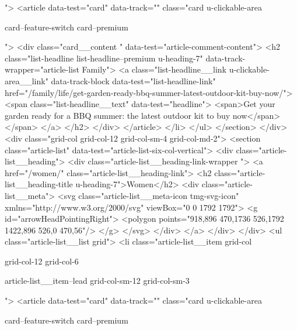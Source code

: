 {{{				
				">
<article data-test="card" data-track="" class="card
			u-clickable-area
			
			card--feature-switch
			card--premium
			
			
			
			
			
			 ">
<div class="card__content " data-test="article-comment-content">
<h2 class="list-headline list-headline--premium u-heading-7" data-track-wrapper="article-list Family">
<a class="list-headline__link u-clickable-area__link" data-track-block data-test="list-headline-link" href="/family/life/get-garden-ready-bbq-summer-latest-outdoor-kit-buy-now/">
<span class="list-headline__text" data-test="headline">
<span>Get your garden ready for a BBQ summer: the latest outdoor kit to buy now</span>
</span>
</a>
</h2>
</div>
</article>
</li>
</ul>
</section>
</div>
<div class="grid-col grid-col-12 grid-col-sm-4 grid-col-md-2">
<section class="article-list" data-test="article-list-six-col-vertical">
<div class="article-list__heading">
<div class="article-list__heading-link-wrapper
				">
<a href="/women/" class="article-list__heading-link">
<h2 class="article-list__heading-title u-heading-7">Women</h2>
<div class="article-list__meta">
<svg class="article-list__meta-icon  tmg-svg-icon" xmlns="http://www.w3.org/2000/svg" viewBox="0 0 1792 1792">
<g id="arrowHeadPointingRight">
<polygon points="918,896 470,1736 526,1792 1422,896 526,0 470,56"/>
</g>
</svg>
</div>
</a>
</div>
</div>
<ul class="article-list__list grid">
<li class="article-list__item
				grid-col
				
				
				
				grid-col-12
				grid-col-6
				
				
				
				
				article-list__item--lead grid-col-sm-12
				grid-col-sm-3
				
				
				">
<article data-test="card" data-track="" class="card
			u-clickable-area
			
			card--feature-switch
			card--premium
			
			
			
			
			
}}}
